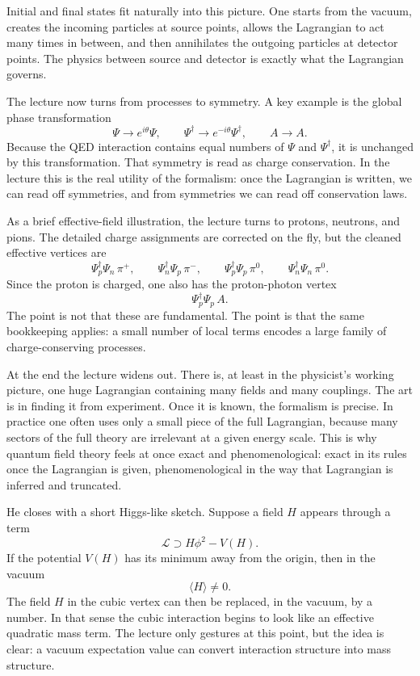 Initial and final states fit naturally into this picture. One starts from the vacuum, creates the incoming particles at source points, allows the Lagrangian to act many times in between, and then annihilates the outgoing particles at detector points. The physics between source and detector is exactly what the Lagrangian governs.

The lecture now turns from processes to symmetry. A key example is the global phase transformation
\begin{equation}
\Psi \to e^{i\theta}\Psi,
\qquad
\Psi^\dagger \to e^{-i\theta}\Psi^\dagger,
\qquad
A \to A.
\end{equation}
Because the QED interaction contains equal numbers of \(\Psi\) and \(\Psi^\dagger\), it is unchanged by this transformation. That symmetry is read as charge conservation. In the lecture this is the real utility of the formalism: once the Lagrangian is written, we can read off symmetries, and from symmetries we can read off conservation laws.

As a brief effective-field illustration, the lecture turns to protons, neutrons, and pions. The detailed charge assignments are corrected on the fly, but the cleaned effective vertices are
\begin{equation}
\Psi_p^\dagger\Psi_n\,\pi^+,
\qquad
\Psi_n^\dagger\Psi_p\,\pi^-,
\qquad
\Psi_p^\dagger\Psi_p\,\pi^0,
\qquad
\Psi_n^\dagger\Psi_n\,\pi^0.
\end{equation}
Since the proton is charged, one also has the proton-photon vertex
\begin{equation}
\Psi_p^\dagger\Psi_p\,A.
\end{equation}
The point is not that these are fundamental. The point is that the same bookkeeping applies: a small number of local terms encodes a large family of charge-conserving processes.

At the end the lecture widens out. There is, at least in the physicist's working picture, one huge Lagrangian containing many fields and many couplings. The art is in finding it from experiment. Once it is known, the formalism is precise. In practice one often uses only a small piece of the full Lagrangian, because many sectors of the full theory are irrelevant at a given energy scale. This is why quantum field theory feels at once exact and phenomenological: exact in its rules once the Lagrangian is given, phenomenological in the way that Lagrangian is inferred and truncated.

He closes with a short Higgs-like sketch. Suppose a field \(H\) appears through a term
\begin{equation}
\mathcal L \supset H\phi^2 - V(H).
\end{equation}
If the potential \(V(H)\) has its minimum away from the origin, then in the vacuum
\begin{equation}
\langle H\rangle \neq 0.
\end{equation}
The field \(H\) in the cubic vertex can then be replaced, in the vacuum, by a number. In that sense the cubic interaction begins to look like an effective quadratic mass term. The lecture only gestures at this point, but the idea is clear: a vacuum expectation value can convert interaction structure into mass structure.

